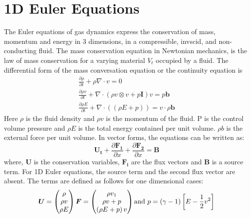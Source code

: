 \documentclass[12pt, oneside]{article}
\begin{document}
\section{1D Euler Equations}
The Euler equations of gas dynamics express the conservation of mass, momentum and energy in 3 dimensions, in a compressible, invscid, and non-conducting fluid. The mass conservation equation in Newtonian mechanics, is the law of mass conservation for a varying material $V_t$ occupied by a fluid. The differential form of the mass conversation equation or the continuity equation is
\begin{subequations}
   \begin{gather}
       \frac{\partial \rho}{\partial t} + \rho  \nabla \cdot v = 0 \label{mass_eqn}\\
       \frac{\partial \rho v}{\partial t} + \nabla \cdot \left( \rho v \otimes v + p \textbf{I}\right)v = p \textbf{b} \label{mom_eqn}\\
       \frac{\partial \rho E}{\partial t} + \nabla \cdot \left( \left( \rho E + p \right)  \right) = v \cdot \rho \textbf{b} \label{en-eqn}
   \end{gather}
\end{subequations}
Here $\rho$ is the fluid density and $\rho v$ is the momentum of the fluid. P is the control volume pressure and $\rho E$ is the total energy contained per unit volume. $\rho b$ is the external force per unit volume. In vector forms, the equations can be written as:
\begin{equation}
    \boldsymbol{U_t} + \frac{\partial \boldsymbol{F_1}}{\partial x} + \frac {\partial \boldsymbol{F_2}} { \partial x} = \boldsymbol{B}
\end{equation}
where, \textbf{U} is the conservation variables, $\boldsymbol{F_i}$ are the flux vectors and \textbf{B} is a source term. For 1D Euler equations, the source term and the second flux vector are absent. The terms are defined as follows for one dimensional cases:
\begin{equation}
    \boldsymbol{U} = \left(   \begin{matrix}
			\rho \\
			\rho v \\
			\rho E
		   \end{matrix} \right) \hfill 
    \boldsymbol{F} = \left(   \begin{matrix}
			\rho v_1\\
			\rho v + p \\
			\left( \rho E + p \right) v
		    \end{matrix} \right) \hfill \text{and } p = \left( \gamma - 1 \right) \left[ E - \frac{1}{2} v^2 \right]
    \label{euler-vec}
\end{equation}
\end{document}
